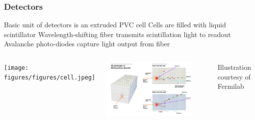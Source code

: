 \documentclass[10pt,professionalfonts,xcolor=table]{beamer}
\begin{document}
\frame
{
\frametitle{\nova Detectors}

\bangon
\bang Basic unit of \nova detectors is an extruded PVC cell
\bang Cells are filled with liquid scintillator
\bang Wavelength-shifting fiber transmits scintillation light to readout
\bang Avalanche photo-diodes capture light output from fiber
\bangoff

\begin{columns}[c]
 \texttt{[image: figures/figures/cell.jpeg]}
~

\centering
 \includegraphics[width=0.85\textwidth]{figures/figures/schematic.jpg}

 {\scriptsize Illustration courtesy of Fermilab}

\end{columns}




}
\end{document}
